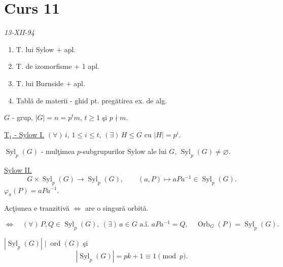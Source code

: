 
\newpage
\section{Curs 11}

\begin{center}
\end{center}
\begin{flushright}
\textit{13-XII-94}
\end{flushright}

\begin{enumerate}
    \item T. lui Sylow + apl.
    \item T. de izomorfisme + 1 apl.
    \item T. lui Burnside + apl.
    \item Tablă de materii - ghid pt. pregătirea ex. de alg.
\end{enumerate}

\medskip
\noindent $G$ - grup, $|G|=n=p^t m$, $t\geq 1$ şi $p\nmid m$.

\bigskip
\noindent\underline{T$_1$ - Sylow I.}\quad
$(\forall)\,i$, $1\leq i\leq t$, $(\exists)\,H\leq G$ cu $|H|=p^i$.

\medskip
\noindent $\operatorname{Syl}_p(G)$ - mulţimea $p$-subgrupurilor Sylow ale lui $G$,
$\operatorname{Syl}_p(G)\neq\varnothing$.

\bigskip
\noindent\underline{Sylow II.}
\[
G\times\operatorname{Syl}_p(G)\longrightarrow\operatorname{Syl}_p(G),
\qquad (a,P)\longmapsto aPa^{-1}\in\operatorname{Syl}_p(G).
\]
\noindent $\varphi_a(P)=aPa^{-1}$.

\medskip
\noindent Acţiunea e tranzitivă $\Longleftrightarrow$ are o singură orbită.

\[
\Longleftrightarrow\quad
(\forall)\,P,Q\in\operatorname{Syl}_p(G),\ (\exists)\,a\in G
\text{ a.î. }aPa^{-1}=Q,
\quad \operatorname{Orb}_G(P)=\operatorname{Syl}_p(G).
\]

\bigskip
\noindent{}\quad
$|\operatorname{Syl}_p(G)|\mid\operatorname{ord}(G)$ şi
\[
|\operatorname{Syl}_p(G)|=pk+1\equiv1\pmod p.
\]


